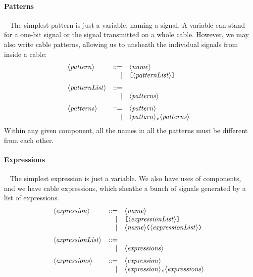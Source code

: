 \documentclass{article}
\begin{document}
\paragraph{Patterns}~ The simplest pattern is just a variable, naming
a signal. A variable can stand for a one-bit signal or the signal
transmitted on a whole cable. However, we may also write cable
patterns, allowing us to unsheath the individual signals from inside
a cable:
\[\begin{array}{lrl}
    \NT{pattern} & ::= & \NT{name} \\
              &   | & \cab{\NT{patternList}} \medskip\\
    \NT{patternList} & ::= & \\
              &   | & \NT{patterns}  \medskip\\
    \NT{patterns} & ::= & \NT{pattern} \\
               &   | & \NT{pattern}\texttt{,}\NT{patterns}
  \end{array} \]
Within any given component, all the names in all the patterns must be
different from each other.

\paragraph{Expressions}~ The simplest expression is just a variable.
We also have uses of components, and we have cable expressions, which
sheathe a bunch of signals generated by a list of expressions.
\[\begin{array}{lrl}
    \NT{expression} & ::= & \NT{name} \\
                    &   | & \cab{\NT{expressionList}} \\
                    &   | & \NT{name}\pa{\NT{expressionList}}\medskip\\
    \NT{expressionList} & ::= & \\
              &   | & \NT{expressions}  \medskip\\
    \NT{expressions} & ::= & \NT{expression} \\
               &   | & \NT{expression}\texttt{,}\NT{expressions}
  \end{array} \]
\end{document}
